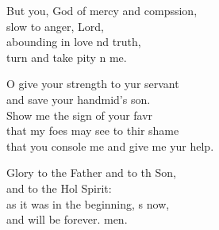 \begin{psalmverse}
\begin{patverse}
But you, God of mercy and compssion,\Med\\
slow to anger,  Lord,\\
abounding in love nd truth,\Med\\
turn and take pity n me.

O give your strength to yur servant\Med\\
and save your handmid’s son.\\
Show me the sign of your favr\Flex\\
that my foes may see to thir shame\Med\\
that you console me and give me yur help.

Glory to the Father and to th Son,\Med\\
and to the Hol Spirit:\\
as it was in the beginning, s now,\Med\\
and will be forever. men.
  \end{patverse}
\end{psalmverse}
